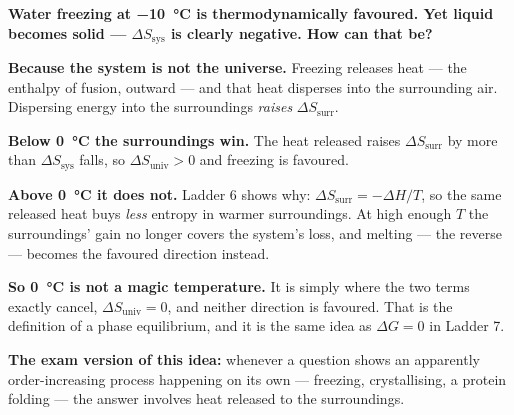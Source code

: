 \documentclass{apchem-worksheet}
\begin{document}
\begin{center}
\end{center}

\begin{workedexample}
\textbf{Water freezing at \SI{-10}{\celsius} is thermodynamically
favoured. Yet liquid becomes solid --- $\Delta S_{\text{sys}}$ is
clearly negative. How can that be?}

\textbf{Because the system is not the universe.} Freezing releases heat
--- the enthalpy of fusion, outward --- and that heat disperses into the
surrounding air. Dispersing energy into the surroundings \emph{raises}
$\Delta S_{\text{surr}}$.

\textbf{Below \SI{0}{\celsius} the surroundings win.} The heat released
raises $\Delta S_{\text{surr}}$ by more than $\Delta S_{\text{sys}}$
falls, so $\Delta S_{\text{univ}} > 0$ and freezing is favoured.

\textbf{Above \SI{0}{\celsius} it does not.} Ladder 6 shows why:
$\Delta S_{\text{surr}} = -\Delta H/T$, so the same released heat buys
\emph{less} entropy in warmer surroundings. At high enough $T$ the
surroundings' gain no longer covers the system's loss, and melting ---
the reverse --- becomes the favoured direction instead.

\textbf{So \SI{0}{\celsius} is not a magic temperature.} It is simply
where the two terms exactly cancel, $\Delta S_{\text{univ}} = 0$, and
neither direction is favoured. That is the definition of a phase
equilibrium, and it is the same idea as $\Delta G = 0$ in Ladder 7.

\textbf{The exam version of this idea:} whenever a question shows an
apparently order-increasing process happening on its own --- freezing,
crystallising, a protein folding --- the answer involves heat released
to the surroundings.
\end{workedexample}
\end{document}
